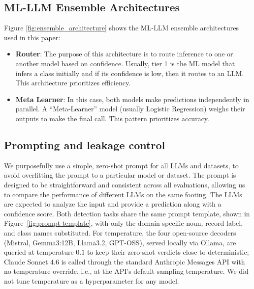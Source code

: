 \documentclass{jmlr}
\begin{document}
\subsection{ML-LLM Ensemble Architectures}
\label{sec:ensemble-architectures}

Figure \ref{fig:ensemble_architecture} shows the ML-LLM ensemble architectures used in this paper:
\begin{itemize}
\item \textbf{Router}: The purpose of this architecture is to route inference to one or another model based on confidence. Usually, tier 1 is the ML model that infers a class initially and if its confidence is low, then it routes to an LLM. This architecture prioritizes efficiency.
\item \textbf{Meta Learner}: In this case, both models make predictions independently in parallel. A ``Meta-Learner'' model (usually Logistic Regression) weighs their outputs to make the final call. This pattern prioritizes accuracy.
\end{itemize}

\subsection{Prompting and leakage control}
\label{sec:prompting-and-leakage-control}

We purposefully use a simple, zero-shot prompt for all LLMs and datasets, to avoid overfitting the prompt to a particular model or dataset. The prompt is designed to be straightforward and consistent across all evaluations, allowing us to compare the performance of different LLMs on the same footing. The LLMs are expected to analyze the input and provide a prediction along with a confidence score. Both detection tasks share the same prompt template, shown in Figure~\ref{fig:prompt-template}, with only the domain-specific noun, record label, and class names substituted. For temperature, the four open-source decoders (Mistral, Gemma3:12B, Llama3.2, GPT-OSS), served locally via Ollama, are queried at temperature $0.1$ to keep their zero-shot verdicts close to deterministic; Claude Sonnet 4.6 is called through the standard Anthropic Messages API with no temperature override, i.e., at the API's default sampling temperature. We did not tune temperature as a hyperparameter for any model.
\end{document}
